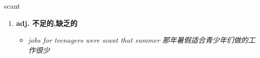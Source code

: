 
\begin{frame}
{\huge scant}
\begin{center}
\begin{enumerate}\Large
  \item \textbf{adj. 不足的,缺乏的}
  \begin{itemize}
    \item \em{\Large{jobs for teenagers were scant that summer 那年暑假适合青少年们做的工作很少}}
  \end{itemize}
\end{enumerate}
\end{center}
\end{frame}

